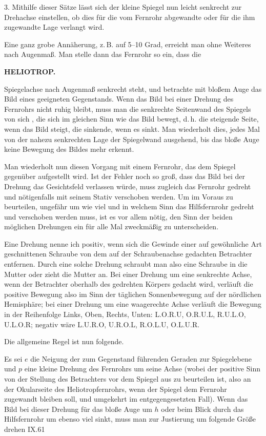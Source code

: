 3. Mithilfe dieser Sätze lässt sich der kleine Spiegel nun leicht senkrecht
zur Drehachse einstellen, ob dies für die vom Fernrohr abgewandte oder für
die ihm zugewandte Lage verlangt wird.

Eine ganz grobe Annäherung, z.\,B. auf 5--10 Grad, erreicht man ohne Weiteres
nach Augenmaß. Man stelle dann das Fernrohr so ein, dass die

\clearpage
\noindent\null\hfill{\small\textbf{HELIOTROP.}}\hfill{}\par\medskip
\noindent Spiegelachse nach Augenmaß senkrecht steht, und betrachte mit bloßem
Auge das Bild eines geeigneten Gegenstands. Wenn das Bild bei einer Drehung
des Fernrohrs nicht ruhig bleibt, muss man die senkrechte Seitenwand des
Spiegels von sich , die sich im gleichen Sinn wie das
Bild bewegt, d.\,h. die steigende Seite, wenn das Bild steigt, die sinkende,
wenn es sinkt. Man wiederholt dies, jedes Mal von der nahezu senkrechten
Lage der Spiegelwand ausgehend, bis das bloße Auge keine Bewegung des Bildes
mehr erkennt.

Man wiederholt nun diesen Vorgang mit einem Fernrohr, das dem Spiegel
gegenüber aufgestellt wird. Ist der Fehler noch so groß, dass das Bild bei
der Drehung das Gesichtsfeld verlassen würde, muss zugleich das Fernrohr
gedreht und nötigenfalls mit seinem Stativ verschoben werden. Um im Voraus
zu beurteilen, ungefähr um wie viel und in welchem Sinn das Hilfsfernrohr
gedreht und verschoben werden muss, ist es vor allem nötig, den Sinn der
beiden möglichen Drehungen ein für alle Mal zweckmäßig zu unterscheiden.

Eine Drehung nenne ich positiv, wenn sich die Gewinde einer auf gewöhnliche
Art geschnittenen Schraube von dem auf der Schraubenachse gedachten
Betrachter entfernen. Durch eine solche Drehung schraubt man also eine
Schraube in die Mutter oder zieht die Mutter an. Bei einer Drehung um eine
senkrechte Achse, wenn der Betrachter oberhalb des gedrehten Körpers gedacht
wird, verläuft die positive Bewegung also im Sinn der täglichen Sonnenbewegung
auf der nördlichen Hemisphäre; bei einer Drehung um eine waagerechte Achse
verläuft die Bewegung in der Reihenfolge Links, Oben, Rechts, Unten: L.O.R.U,
O.R.U.L, R.U.L.O, U.L.O.R; negativ wäre L.U.R.O, U.R.O.L, R.O.L.U,
O.L.U.R.

Die allgemeine Regel ist nun folgende.

Es sei $e$ die Neigung der zum Gegenstand führenden Geraden zur Spiegelebene
und $p$ eine kleine Drehung des Fernrohrs um seine Achse (wobei der positive
Sinn von der Stellung des Betrachters vor dem Spiegel aus zu beurteilen ist,
also an der Okularseite des Heliotropfernrohrs, wenn der Spiegel dem Fernrohr
zugewandt bleiben soll, und umgekehrt im entgegengesetzten Fall). Wenn das
Bild bei dieser Drehung für das bloße Auge um $h$  oder
beim Blick durch das Hilfsfernrohr um ebenso viel sinkt, muss man zur
Justierung um folgende Größe drehen
\vfill\noindent IX.\hfill61

